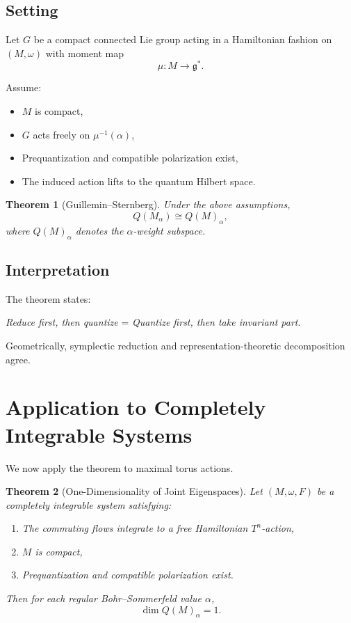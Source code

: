 \documentclass[11pt]{article}
\newtheorem{theorem}{Theorem}[section]
\begin{document}
\subsection{Setting}

Let $G$ be a compact connected Lie group acting in a Hamiltonian fashion on $(M,\omega)$ with moment map
\[
\mu : M \to \mathfrak{g}^*.
\]

Assume:

\begin{itemize}
\item $M$ is compact,
\item $G$ acts freely on $\mu^{-1}(\alpha)$,
\item Prequantization and compatible polarization exist,
\item The induced action lifts to the quantum Hilbert space.
\end{itemize}

\begin{theorem}[Guillemin--Sternberg]
Under the above assumptions,
\[
Q(M_\alpha) \cong Q(M)_\alpha,
\]
where $Q(M)_\alpha$ denotes the $\alpha$-weight subspace.
\end{theorem}

\subsection{Interpretation}

The theorem states:

\begin{center}
\emph{Reduce first, then quantize} = \emph{Quantize first, then take invariant part}.
\end{center}

Geometrically, symplectic reduction and representation-theoretic decomposition agree.

\section{Application to Completely Integrable Systems}

We now apply the theorem to maximal torus actions.

\begin{theorem}[One-Dimensionality of Joint Eigenspaces]
Let $(M,\omega,F)$ be a completely integrable system satisfying:

\begin{enumerate}
\item The commuting flows integrate to a free Hamiltonian $T^n$-action,
\item $M$ is compact,
\item Prequantization and compatible polarization exist.
\end{enumerate}

Then for each regular Bohr--Sommerfeld value $\alpha$,
\[
\dim Q(M)_\alpha = 1.
\]
\end{theorem}
\end{document}
